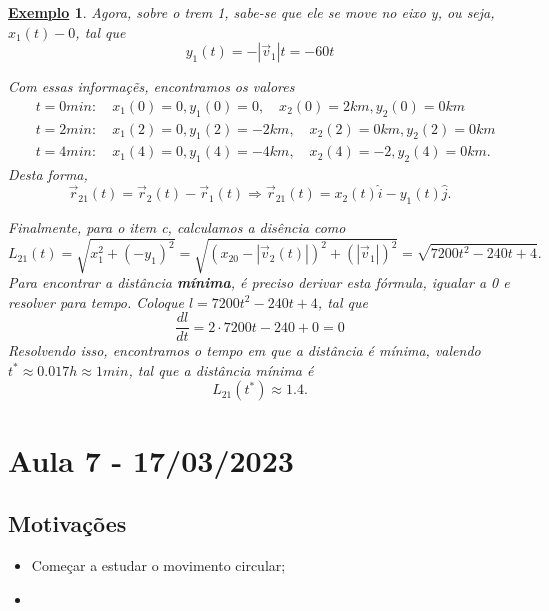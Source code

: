 \documentclass{article}
\newtheorem{example}{\underline{Exemplo}}
\begin{document}
\begin{example}
      Agora, sobre o trem 1, sabe-se que ele se move no eixo y, ou seja, $x_{1}(t) - 0$, tal que 
        $$
          y_{1}(t) = -|\vec{v}_{1}|t = -60t
        $$
      
    Com essas informa\c c\~es, encontramos os valores 
   \begin{align*}
     &t = 0min:\quad x_{1}(0) = 0, y_{1}(0) = 0,\quad x_{2}(0) = 2km, y_{2}(0) = 0km\\
     &t = 2min:\quad x_{1}(2) = 0, y_{1}(2) = -2km,\quad x_{2}(2) = 0km, y_{2}(2) = 0km\\
     &t = 4min:\quad x_{1}(4) = 0, y_{1}(4) = -4km,\quad x_{2}(4) = -2, y_{2}(4) = 0km.
   \end{align*}
   Desta forma, 
     $$
     \vec{r}_{21}(t) = \vec{r}_{2}(t) - \vec{r}_{1}(t) \Rightarrow \vec{r}_{21}(t) = x_{2}(t)\hat{i} - y_{1}(t)\hat{j}.
     $$

    Finalmente, para o item c, calculamos a dis\^encia como 
      $$
      L_{21}(t) = \sqrt{x_{1}^{2} + (-y_{1})^{2}} = \sqrt{(x_{20}-|\vec{v}_{2}(t)|)^{2} + (|\vec{v}_{1}|)^{2}} = \sqrt{7200t^{2} - 240t + 4}.
      $$
    Para encontrar a dist\^ancia \textbf{m\'inima}, \'e preciso derivar esta f\'ormula, igualar a 0 e resolver para tempo. Coloque $l = 7200t^{2}-240t+4$,
  tal que 
    $$
      \frac{dl}{dt} = 2 \cdot 7200t - 240 + 0 = 0
    $$
    Resolvendo isso, encontramos o tempo em que a dist\^ancia \'e m\'inima, valendo $t^{*}\approx 0.017h\approx 1min$, tal que a dist\^ancia m\'inima \'e 
      $$
        L_{21}(t^{*})\approx 1.4.
      $$
 \end{example}
\newpage

\section{Aula 7 - 17/03/2023}
\subsection{Motiva\c c\~oes}
\begin{itemize}
  \item Come\c car a estudar o movimento circular;
  \item 
\end{itemize}
\end{document}

